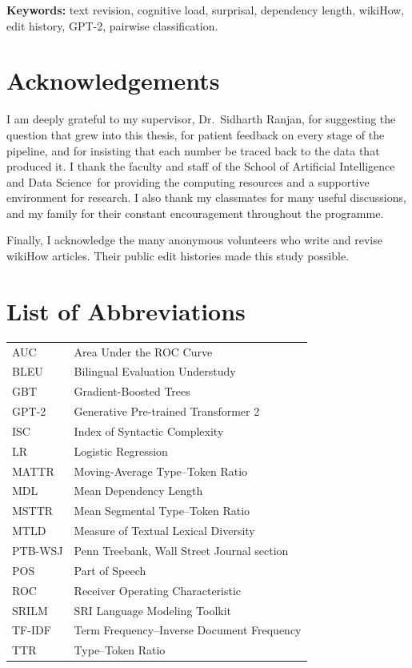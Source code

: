 \documentclass[12pt,a4paper,oneside]{report}
\newcommand{\supervisor}{Dr.~Sidharth Ranjan}
\newcommand{\department}{School of Artificial Intelligence and Data Science}
\begin{document}
\smallskip
\noindent\textbf{Keywords:} text revision, cognitive load, surprisal, dependency length, wikiHow, edit history, GPT-2, pairwise classification.

\chapter*{Acknowledgements}
I am deeply grateful to my supervisor, \supervisor, for suggesting the question that grew into this thesis, for patient feedback on every stage of the pipeline, and for insisting that each number be traced back to the data that produced it. I thank the faculty and staff of the \department\ for providing the computing resources and a supportive environment for research. I also thank my classmates for many useful discussions, and my family for their constant encouragement throughout the programme.

Finally, I acknowledge the many anonymous volunteers who write and revise wikiHow articles. Their public edit histories made this study possible.

\tableofcontents
\listoffigures
\listoftables

\chapter*{List of Abbreviations}
\begin{tabular}{@{}ll}
AUC & Area Under the ROC Curve\\
BLEU & Bilingual Evaluation Understudy\\
GBT & Gradient-Boosted Trees\\
GPT-2 & Generative Pre-trained Transformer 2\\
ISC & Index of Syntactic Complexity\\
LR & Logistic Regression\\
MATTR & Moving-Average Type--Token Ratio\\
MDL & Mean Dependency Length\\
MSTTR & Mean Segmental Type--Token Ratio\\
MTLD & Measure of Textual Lexical Diversity\\
PTB-WSJ & Penn Treebank, Wall Street Journal section\\
POS & Part of Speech\\
ROC & Receiver Operating Characteristic\\
SRILM & SRI Language Modeling Toolkit\\
TF-IDF & Term Frequency--Inverse Document Frequency\\
TTR & Type--Token Ratio\\
\end{tabular}
\end{document}
